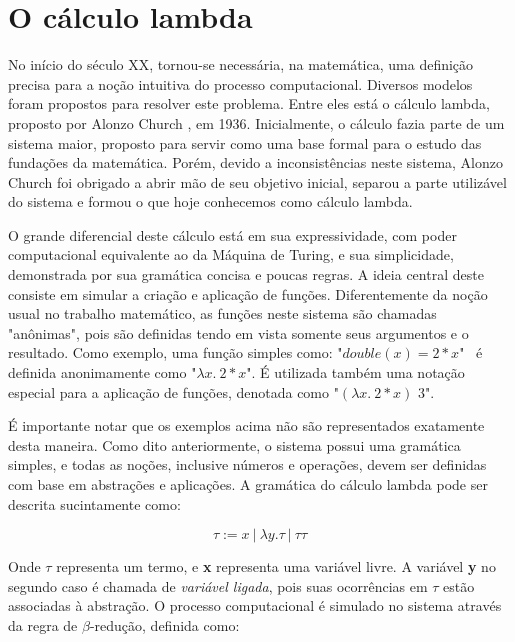 \section{O cálculo lambda}
No início do século XX, tornou-se necessária, na matemática, uma definição 
precisa para a noção intuitiva do processo computacional. Diversos modelos foram
propostos para resolver este problema. Entre eles está o cálculo lambda,
proposto por Alonzo Church \cite{lambda_first}, em 1936. Inicialmente, o cálculo
fazia parte de um sistema maior, proposto para servir como uma base
formal para o estudo das fundações da matemática. Porém, devido a
inconsistências neste sistema, Alonzo Church foi obrigado a abrir mão de seu
objetivo inicial, separou a parte utilizável do sistema e formou o que hoje
conhecemos como cálculo lambda.

O grande diferencial deste cálculo está em sua expressividade, com poder
computacional equivalente ao da Máquina de Turing, e sua simplicidade,
demonstrada por sua gramática concisa e poucas regras. A ideia central deste
consiste em simular a criação e aplicação de funções. Diferentemente da noção
usual no trabalho matemático, as funções neste sistema são chamadas "anônimas",
pois são definidas tendo em vista somente seus argumentos e o resultado. Como
exemplo, uma função simples como: "$double(x) = 2*x$" \ é definida anonimamente como
"$\lambda x.\ 2*x$". É utilizada também uma notação especial para a aplicação de
funções, denotada como "$ (\lambda x.\ 2*x)$  $3$".

É importante notar que os exemplos acima não são representados exatamente desta
maneira. Como dito anteriormente, o sistema possui uma gramática simples, e
todas as noções, inclusive números e operações, devem ser definidas com base em
abstrações e aplicações. A gramática do cálculo lambda pode ser descrita
sucintamente como:

\[ \tau := x\ |\ \lambda y.\tau\ |\ \tau \tau \]

Onde $\tau$ representa um termo, e \textbf{x} representa uma variável livre. A
variável \textbf{y} no segundo caso é chamada de \textit{variável ligada},
pois suas ocorrências em $\tau$ estão associadas à abstração. O processo
computacional é simulado no sistema através da regra de $\beta$-redução,
definida como:


